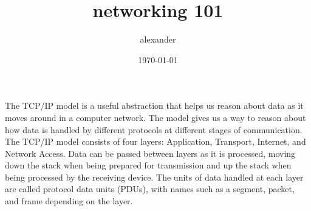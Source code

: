 \documentclass[12pt]{article}
\title{networking 101}
\author{alexander}
\date{\today}
\begin{document}
\maketitle

The TCP/IP model is a useful abstraction that helps us reason about data as it moves around in a computer network. The model gives us a way to reason about how data is handled by different protocols at different stages of communication. The TCP/IP model consists of four layers: Application, Transport, Internet, and Network Access. Data can be passed between layers as it is processed, moving down the stack when being prepared for transmission and up the stack when being processed by the receiving device. The units of data handled at each layer are called protocol data units (PDUs), with names such as a segment, packet, and frame depending on the layer.\\
\end{document}
